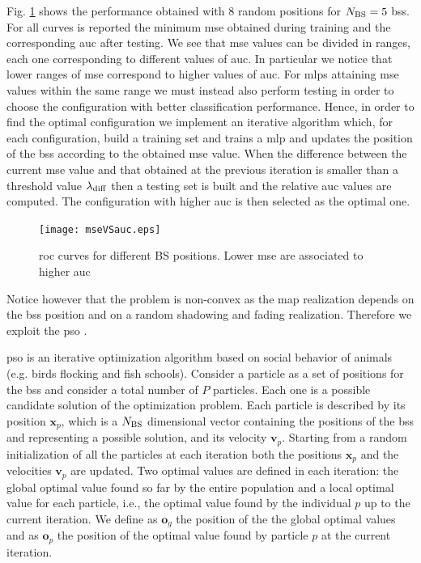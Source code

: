 \documentclass[twocolumns]{IEEEtran}
\begin{document}
Fig. \ref{fig:mseVSauc} shows the performance obtained with $8$ random positions for $N_{\rm BS}=5$ \acp{bs}. For all curves is reported the minimum \ac{mse} obtained during training and the corresponding \ac{auc} after testing. We see that \ac{mse} values can be divided in ranges, each one corresponding to different values of \ac{auc}. In particular we notice that lower ranges of \ac{mse} correspond to higher values of \ac{auc}. For \acp{mlp} attaining  \ac{mse} values within the same range we must instead also perform testing in order to choose the configuration with better classification performance. Hence, in order to find the optimal configuration we implement an iterative algorithm which, for each configuration, build a training set and trains a \ac{mlp} and updates the position of the \acp{bs} according to the obtained \ac{mse} value. When the difference between the current \ac{mse} value and that obtained at the previous iteration is smaller than a threshold value $\lambda_{\rm diff}$ then a testing set is built and the relative \ac{auc} values are computed. The configuration with higher \ac{auc} is then selected as the optimal one.

 \begin{figure}
     \centering
     \texttt{[image: mseVSauc.eps]}
     \caption{\ac{roc} curves for different BS positions. Lower \ac{mse} are associated to higher \ac{auc}}
     \label{fig:mseVSauc}
 \end{figure}

Notice however that the problem is non-convex as the map realization depends on the \acp{bs} position and on a random shadowing and fading realization. Therefore we exploit the \ac{pso} \cite{Kennedy-11}.

\ac{pso} is an iterative optimization algorithm based on social behavior of animals (e.g. birds flocking and fish schools). Consider a particle as a set of positions for the \acp{bs} and consider a total number of $P$ particles. Each one is a possible candidate solution of the optimization problem. Each particle is described by its position $\bm{x}_p$, which is a $N_{\rm BS}$ dimensional vector containing the positions of the \acp{bs} and representing a possible solution, and its velocity $\bm{v}_p$.
Starting from a random initialization of all the particles at each iteration both the positions $\bm{x}_p$ and the velocities $\bm{v}_p$ are updated. Two optimal values are defined in each iteration: the global optimal value found so far by the entire population and a local optimal value for each particle, i.e., the optimal value found by the individual $p$ up to the current iteration. We define as $\bm{o}_g$ the position of the the global optimal values and as $\bm{o}_p$ the position of the optimal value found by particle $p$ at the current iteration.
\end{document}
